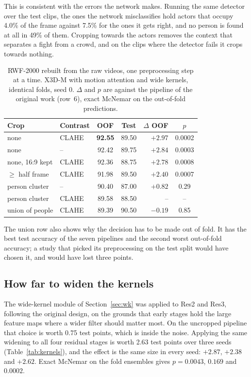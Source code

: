 \documentclass[conference]{IEEEtran}
\begin{document}
This is consistent with the errors the network makes. Running the same
detector over the test clips, the ones the network misclassifies hold
actors that occupy 4.0\% of the frame against 7.5\% for the ones it gets
right, and no person is found at all in 49\% of them. Cropping towards the actors
removes the context that separates a fight from a crowd, and on the clips
where the detector fails it crops towards nothing.

\begin{table}[t]
  \centering
  \caption{RWF-2000 rebuilt from the raw videos, one preprocessing step at
  a time. X3D-M with motion attention and wide kernels, identical folds,
  seed 0. $\Delta$ and $p$ are against the pipeline of the original work
  (row~6), exact McNemar on the out-of-fold predictions.}
  \label{tab:pipeline}
  \setlength{\tabcolsep}{3pt}
  \begin{tabular}{llccrc}
    \toprule
    Crop & Contrast & OOF & Test & $\Delta$ OOF & $p$ \\
    \midrule
    none            & CLAHE & \textbf{92.55} & 89.50 & $+2.97$ & 0.0002 \\
    none            & --    & 92.42 & 89.75 & $+2.84$ & 0.0003 \\
    none, 16:9 kept & CLAHE & 92.36 & 88.75 & $+2.78$ & 0.0008 \\
    $\geq$ half frame & CLAHE & 91.98 & 89.50 & $+2.40$ & 0.0007 \\
    person cluster  & --    & 90.40 & 87.00 & $+0.82$ & 0.29 \\
    person cluster  & CLAHE & 89.58 & 88.50 & --      & --   \\
    union of people & CLAHE & 89.39 & 90.50 & $-0.19$ & 0.85 \\
    \bottomrule
  \end{tabular}
\end{table}

The union row also shows why the decision has to be made out of fold. It
has the best test accuracy of the seven pipelines and the second worst
out-of-fold accuracy; a study that picked its preprocessing on the test
split would have chosen it, and would have lost three points.

\subsection{How far to widen the kernels}
\label{sec:kernels}

The wide-kernel module of Section~\ref{sec:wk} was applied to Res2 and
Res3, following the original design, on the grounds that early stages hold
the large feature maps where a wider filter should matter most. On the
uncropped pipeline that choice is worth 0.75 test points, which is inside
the noise. Applying the same widening to all four residual stages is worth
2.63 test points over three seeds (Table~\ref{tab:kernels}), and the effect
is the same size in every seed: $+2.87$, $+2.38$ and $+2.62$. Exact McNemar
on the fold ensembles gives $p = 0.0043$, $0.169$ and $0.0002$.
\end{document}
